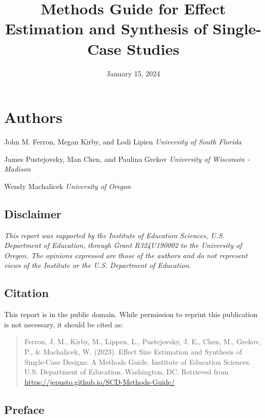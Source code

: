 \documentclass[
]{book}
\title{Methods Guide for Effect Estimation and Synthesis of Single-Case Studies}
\author{}
\date{\vspace{-2.5em}January 15, 2024}
\begin{document}
\maketitle

{
\setcounter{tocdepth}{1}
\tableofcontents
}
\hypertarget{authors}{%
\chapter*{Authors}\label{authors}}

John M. Ferron, Megan Kirby, and Lodi Lipien
\emph{University of South Florida}

James Pustejovsky, Man Chen, and Paulina Grekov
\emph{University of Wisconsin - Madison}

Wendy Machalicek
\emph{University of Oregon}

\hypertarget{disclaimer}{%
\section*{Disclaimer}\label{disclaimer}}

\emph{This report was supported by the Institute of Education Sciences, U.S. Department of Education, through Grant R324U190002 to the University of Oregon. The opinions expressed are those of the authors and do not represent views of the Institute or the U.S. Department of Education.}

\hypertarget{citation}{%
\section*{Citation}\label{citation}}

This report is in the public domain. While permission to reprint this publication is not necessary, it should be cited as:

\begin{quote}
Ferron, J. M., Kirby, M., Lippen, L., Pustejovsky, J. E., Chen, M., Grekov, P., \& Machalicek, W. (2023). Effect Size Estimation and Synthesis of Single-Case Designs: A Methods Guide. Institute of Education Sciences. U.S. Department of Education. Washington, DC. Retrieved from \url{https://jepusto.github.io/SCD-Methods-Guide/}
\end{quote}

\hypertarget{preface}{%
\section*{Preface}\label{preface}}
\end{document}
